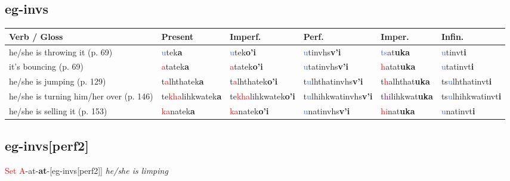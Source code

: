 \documentclass[oneside,openany]{book}%
\begin{document}
\subsection*{eg-invs}%
\begin{tabularx}{\textwidth}{>{\hsize=1.5\hsize\RaggedRight}X >{\hsize=0.9\hsize}X >{\hsize=0.9\hsize}X >{\hsize=0.9\hsize}X >{\hsize=0.9\hsize}X >{\hsize=0.9\hsize}X}%
\toprule%
\textbf{Verb / Gloss}&\textbf{Present}&\textbf{Imperf.}&\textbf{Perf.}&\textbf{Imper.}&\textbf{Infin.}\\%
\midrule%
he/she is throwing it (p. 69)&\textcolor{RoyalBlue}{u}tek\textbf{a}&\textcolor{RoyalBlue}{u}tek\textbf{o'i}&\textcolor{RoyalBlue}{u}tinvhs\textbf{v'i}&\textcolor{RoyalBlue}{ts}at\textbf{uka}&\textcolor{RoyalBlue}{u}tinvt\textbf{i}\\%
it's bouncing (p. 69)&\textcolor{Red}{a}tatek\textbf{a}&\textcolor{Red}{a}tatek\textbf{o'i}&\textcolor{RoyalBlue}{u}tatinvhs\textbf{v'i}&\textcolor{Red}{h}atat\textbf{uka}&\textcolor{RoyalBlue}{u}tatinvt\textbf{i}\\%
he/she is jumping (p. 129)&t\textcolor{Red}{a}lhthatek\textbf{a}&t\textcolor{Red}{a}lhthatek\textbf{o'i}&t\textcolor{RoyalBlue}{u}lhthatinvhs\textbf{v'i}&t\textcolor{Red}{h}alhthat\textbf{uka}&ts\textcolor{RoyalBlue}{u}lhthatinvt\textbf{i}\\%
he/she is turning him/her over (p. 146)&te\textcolor{Red}{kha}lihkwatek\textbf{a}&te\textcolor{Red}{kha}lihkwatek\textbf{o'i}&t\textcolor{RoyalBlue}{u}lhihkwatinvhs\textbf{v'i}&t\textcolor{Purple}{hi}lihkwat\textbf{uka}&ts\textcolor{RoyalBlue}{u}lhihkwatinvt\textbf{i}\\%
he/she is selling it (p. 153)&\textcolor{Red}{ka}natek\textbf{a}&\textcolor{Red}{ka}natek\textbf{o'i}&\textcolor{RoyalBlue}{u}natinvhs\textbf{v'i}&\textcolor{Red}{hi}nat\textbf{uka}&\textcolor{RoyalBlue}{u}natinvt\textbf{i}\\%
\bottomrule%
\end{tabularx}%
\vspace{1em}%
\needspace{1in}%
\subsection*{eg-invs[perf2]}%
\textcolor{Red}{Set A}{-}at{-}\textbf{at}{-}[eg-invs[perf2]] \textit{ he/she is limping} \\%
\vspace{1em}%
\needspace{1in}%
\end{document}

